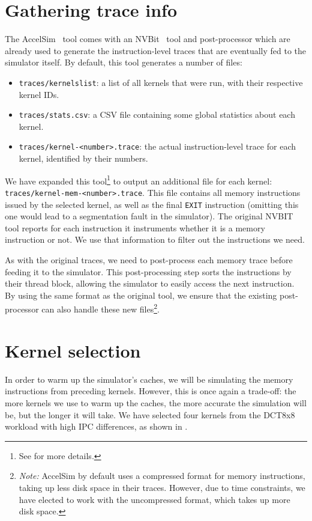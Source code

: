 \section{Gathering trace info}\label{sec:trace-info}
The AccelSim~\cite{accelsim} tool comes with an NVBit~\cite{nvbit} tool and post-processor which are already used to generate the instruction-level traces that are eventually fed to the simulator itself.
By default, this tool generates a number of files:
\begin{itemize}
    \item \verb|traces/kernelslist|: a list of all kernels that were run, with their respective kernel IDs.
    \item \verb|traces/stats.csv|: a CSV file containing some global statistics about each kernel.
    \item \verb|traces/kernel-<number>.trace|: the actual instruction-level trace for each kernel, identified by their numbers.
\end{itemize}

We have expanded this tool\footnote{See  for more details.} to output an additional file for each kernel: \verb|traces/kernel-mem-<number>.trace|.
This file contains all memory instructions issued by the selected kernel, as well as the final \verb|EXIT| instruction (omitting this one would lead to a segmentation fault in the simulator).
The original NVBIT tool reports for each instruction it instruments whether it is a memory instruction or not.
We use that information to filter out the instructions we need.

As with the original traces, we need to post-process each memory trace before feeding it to the simulator.
This post-processing step sorts the instructions by their thread block, allowing the simulator to easily access the next instruction.
By using the same format as the original tool, we ensure that the existing post-processor can also handle these new files\footnote{
    \textit{Note:} AccelSim by default uses a compressed format for memory instructions, taking up less disk space in their traces.
    However, due to time constraints, we have elected to work with the uncompressed format, which takes up more disk space.
}.

\FloatBarrier
\section{Kernel selection}\label{sec:kernel-selection}
In order to warm up the simulator's caches, we will be simulating the memory instructions from preceding kernels.
However, this is once again a trade-off: the more kernels we use to warm up the caches, the more accurate the simulation will be, but the longer it will take.
We have selected four kernels from the DCT8x8 workload with high IPC differences, as shown in .

